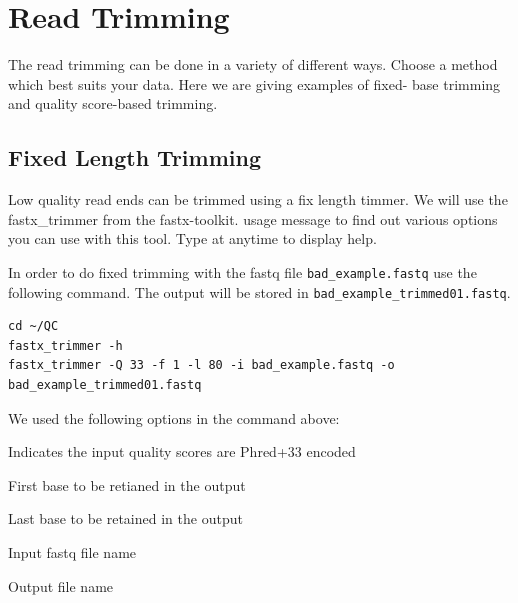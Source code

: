 \section{Read Trimming}
The read trimming can be done in a variety of different ways. Choose a method
which best suits your data. Here we are giving examples of fixed-  base trimming
and quality score-based trimming.

\subsection{Fixed Length Trimming}
Low quality read ends can be trimmed using a fix length timmer. We will use the
fastx\_trimmer from the fastx-toolkit. usage message to find out various options
you can use with this tool. Type  at anytime to display help.

\begin{steps}
In order to do fixed trimming with the fastq file \texttt{bad\_example.fastq}
use the following command. The output will be stored in
\texttt{bad\_example\_trimmed01.fastq}.

\begin{lstlisting}
cd ~/QC
fastx_trimmer -h
fastx_trimmer -Q 33 -f 1 -l 80 -i bad_example.fastq -o bad_example_trimmed01.fastq
\end{lstlisting}
\end{steps}

\begin{note}
We used the following options in the command above:
\begin{description}[style=multiline,labelindent=0cm,align=right,leftmargin=5cm,font=\ttfamily]
 \item[-Q 33] Indicates the input quality scores are Phred+33 encoded
 \item[-f] First base to be retianed in the output
 \item[-l] Last base to be retained in the output
 \item[-i] Input fastq file name
 \item[-o] Output file name
\end{description}
\end{note}

